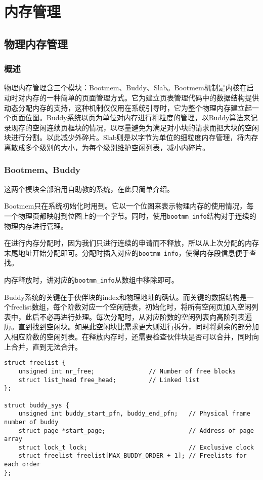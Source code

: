 \section{内存管理}

\subsection{物理内存管理}

\subsubsection{概述}

物理内存管理含三个模块：Bootmem、Buddy、Slab。Bootmem机制是内核在启动时对内存的一种简单的页面管理方式。它为建立页表管理代码中的数据结构提供动态分配内存的支持，这种机制仅仅用在系统引导时，它为整个物理内存建立起一个页面位图。Buddy系统以页为单位对内存进行粗粒度的管理，以Buddy算法来记录现存的空闲连续页框块的情况，以尽量避免为满足对小块的请求而把大块的空闲块进行分割。以此减少外碎片。Slab则是以字节为单位的细粒度内存管理，将内存离散成多个级别的大小，为每个级别维护空闲列表，减小内碎片。


\subsubsection{Bootmem、Buddy}

这两个模块全部沿用自助教的系统，在此只简单介绍。

Bootmem只在系统初始化时用到。它以一个位图来表示物理内存的使用情况，每一个物理页都映射到位图上的一个字节。同时，使用\texttt{bootmm\_info}结构对于连续的物理内存进行管理。

在进行内存分配时，因为我们只进行连续的申请而不释放，所以从上次分配的内存末尾地址开始分配即可。分配时插入对应的\texttt{bootmm\_info}，使得内存段信息便于查找。

内存释放时，讲对应的\texttt{bootmm\_info}从数组中移除即可。

Buddy系统的关键在于伙伴块的index和物理地址的确认。而关键的数据结构是一个freelist数组，每个阶数对应一个空闲链表，初始化时，将所有空闲页加入空闲列表中，此后不必再进行处理。每次分配时，从对应阶数的空闲列表向高阶列表遍历。直到找到空闲块。如果此空闲块比需求更大则进行拆分，同时将剩余的部分加入相应阶数的空闲列表。在释放内存时，还需要检查伙伴块是否可以合并，同时向上合并，直到无法合并。

\begin{lstlisting}[caption=Buddy系统核心数据结构]
struct freelist {
    unsigned int nr_free;               // Number of free blocks
    struct list_head free_head;         // Linked list
};

struct buddy_sys {
    unsigned int buddy_start_pfn, buddy_end_pfn;   // Physical frame number of buddy
    struct page *start_page;                       // Address of page array
    struct lock_t lock;                            // Exclusive clock
    struct freelist freelist[MAX_BUDDY_ORDER + 1]; // Freelists for each order
};
\end{lstlisting}

